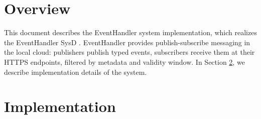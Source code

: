 \documentclass[a4paper]{arrowhead}
\begin{document}
\sloppy

\ArrowheadSetup

\begin{center}
  \vspace*{1cm}
  \huge{\arrowtitle}

  \vspace*{0.2cm}
  \LARGE{\arrowtype}
  \vspace*{1cm}

  \vspace*{\fill}


  \vspace*{1cm}
  \vspace*{\fill}

  \begin{abstract}
    This document describes the design and implementation of the EventHandler support system of Arrowhead 5.2.2 (\texttt{ah5-EventHandler-java-spring}).
  \end{abstract}

  \vspace*{1cm}
\end{center}

\newpage

\tableofcontents
\newpage

\section{Overview}
\label{sec:overview}

This document describes the EventHandler system implementation, which realizes the EventHandler SysD \cite{eh-sysd}. EventHandler provides publish-subscribe messaging in the local cloud: publishers publish typed events, subscribers receive them at their HTTPS endpoints, filtered by metadata and validity window.
In Section \ref{Implementation}, we describe implementation details of the system.

\newpage

\section{Implementation}
\label{Implementation}
\end{document}

